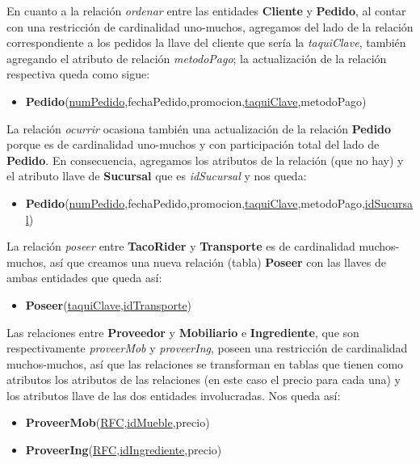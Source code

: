\documentclass[11pt,letterpaper]{article}
\begin{document}
En cuanto a la relación \textit{ordenar} entre las entidades \textbf{Cliente} y \textbf{Pedido}, al contar con una restricción de cardinalidad uno-muchos, agregamos del lado de la relación correspondiente a los pedidos la llave del cliente que sería la \textit{taquiClave}, también agregando el atributo de relación \textit{metodoPago}; la actualización de la relación respectiva queda como sigue:

\begin{itemize}
\item \footnotesize{\textbf{Pedido}(\underline{numPedido},fechaPedido,promocion,\underline{taquiClave},metodoPago)}
\end{itemize}

La relación \textit{ocurrir} ocasiona también una actualización de la relación \textbf{Pedido} porque es de cardinalidad uno-muchos y con participación total del lado de \textbf{Pedido}. En consecuencia, agregamos los atributos de la relación (que no hay) y el atributo llave de \textbf{Sucursal} que es \textit{idSucursal} y nos queda:



\begin{itemize}
\item \footnotesize{\textbf{Pedido}(\underline{numPedido},fechaPedido,promocion,\underline{taquiClave},metodoPago,\underline{idSucursal})}
\end{itemize}

La relación \textit{poseer} entre \textbf{TacoRider} y \textbf{Transporte} es de cardinalidad muchos-muchos, así que creamos una nueva relación (tabla) \textbf{Poseer} con las llaves de ambas entidades que queda así:

\begin{itemize}
\item \footnotesize{\textbf{Poseer}(\underline{taquiClave},\underline{idTransporte})}
\end{itemize}

Las relaciones entre \textbf{Proveedor} y \textbf{Mobiliario} e \textbf{Ingrediente}, que son respectivamente \textit{proveerMob} y \textit{proveerIng}, poseen una restricción de cardinalidad muchos-muchos, así que las relaciones se transforman en tablas que tienen como atributos los atributos de las relaciones (en este caso el precio para cada una) y los atributos llave de las dos entidades involucradas. Nos queda así:

\begin{itemize}
\item \footnotesize{\textbf{ProveerMob}(\underline{RFC},\underline{idMueble},precio)}
\item \footnotesize{\textbf{ProveerIng}(\underline{RFC},\underline{idIngrediente},precio)}
\end{itemize}
\end{document}
